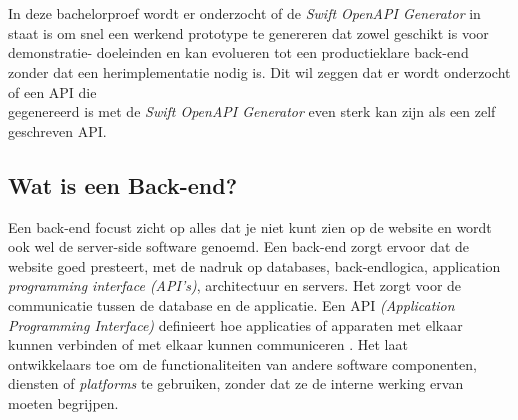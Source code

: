 \chapter{}%
\label{ch:stand-van-zaken}



In deze bachelorproef wordt er onderzocht of de \textit{Swift OpenAPI Generator} in staat is om snel een werkend prototype te genereren dat zowel geschikt is voor demonstratie- doeleinden en kan evolueren tot een productieklare back-end zonder dat een herimplementatie nodig is. Dit wil zeggen dat er wordt onderzocht of een API die \\gegenereerd is met de \textit{Swift OpenAPI Generator} even sterk kan zijn als een zelf \\geschreven API.

\section{Wat is een Back-end?}

Een back-end focust zicht op alles dat je niet kunt zien op de website en wordt ook wel de server-side software genoemd. Een back-end zorgt ervoor dat de website goed presteert, met de nadruk op databases, back-endlogica, application \\ \textit{programming interface (API's)}, architectuur en servers. Het zorgt voor de \\communicatie tussen de database en de applicatie. 
Een API \textit{(Application \\Programming Interface)} definieert hoe applicaties of apparaten met elkaar \\kunnen verbinden of met elkaar kunnen communiceren \autocite{IBM}. Het laat \\ontwikkelaars toe om de functionaliteiten van andere software componenten, \\diensten of \textit{platforms} te gebruiken, zonder dat ze de interne werking ervan moeten begrijpen. \\
 
